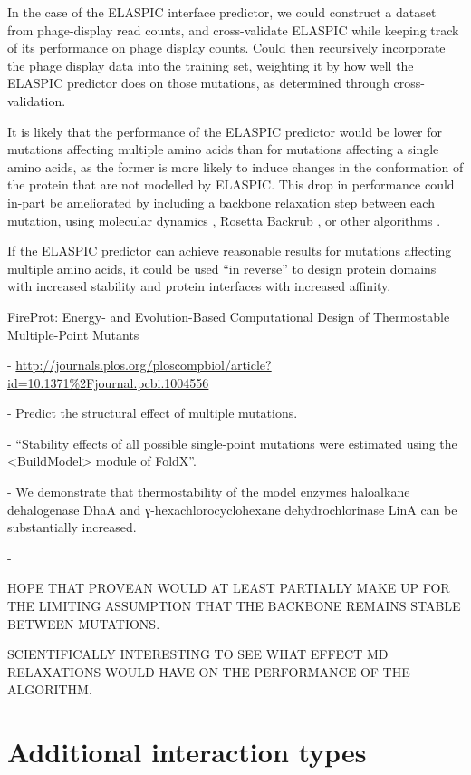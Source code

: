 In the case of the ELASPIC interface predictor, we could construct a dataset from phage-display read counts, and cross-validate ELASPIC while keeping track of its performance on phage display counts. Could then recursively incorporate the phage display data into the training set, weighting it by how well the ELASPIC predictor does on those mutations, as determined through cross-validation.

It is likely that the performance of the ELASPIC predictor would be lower for mutations affecting multiple amino acids than for mutations affecting a single amino acids, as the former is more likely to induce changes in the conformation of the protein that are not modelled by ELASPIC. This drop in performance could in-part be ameliorated by including a backbone relaxation step between each mutation, using molecular dynamics \cite{abraham_gromacs:_2015}, Rosetta Backrub \cite{smith_predicting_2011}, or other algorithms \cite{sun_protein_2016}.

If the ELASPIC predictor can achieve reasonable results for mutations affecting multiple amino acids, it could be used ``in reverse'' to design protein domains with increased stability and protein interfaces with increased affinity.

FireProt: Energy- and Evolution-Based Computational Design of Thermostable Multiple-Point Mutants

  - \url{http://journals.plos.org/ploscompbiol/article?id=10.1371%2Fjournal.pcbi.1004556}

  - Predict the structural effect of multiple mutations.

  - ``Stability effects of all possible single-point mutations were estimated using the <BuildModel> module of FoldX''.

  - We demonstrate that thermostability of the model enzymes haloalkane dehalogenase DhaA and γ-hexachlorocyclohexane dehydrochlorinase LinA can be substantially increased.

  - \cite{bednar_fireprot:_2015}



HOPE THAT PROVEAN WOULD AT LEAST PARTIALLY MAKE UP FOR THE LIMITING ASSUMPTION THAT THE BACKBONE REMAINS STABLE BETWEEN MUTATIONS.

SCIENTIFICALLY INTERESTING TO SEE WHAT EFFECT MD RELAXATIONS WOULD HAVE ON THE PERFORMANCE OF THE ALGORITHM.



\section{Additional interaction types}

